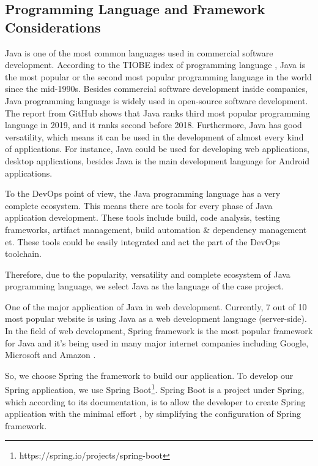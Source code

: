 \subsection{Programming Language and Framework Considerations}
Java is one of the most common languages used in commercial software development. According to the TIOBE index of programming language \cite{indexTIO42:online}, Java is the most popular or the second most popular programming language in the world since the mid-1990s. Besides commercial software development inside companies, Java programming language is widely used in open-source software development. The report \cite{TheState3:online} from GitHub shows that Java ranks third most popular programming language in 2019, and it ranks second before 2018. Furthermore, Java has good versatility, which means it can be used in the development of almost every kind of applications. For instance, Java could be used for developing web applications, desktop applications, besides Java is the main development language for Android applications.
\par
To the DevOps point of view, the Java programming language has a very complete ecosystem. This means there are tools for every phase of Java application development. These tools include build, code analysis, testing frameworks, artifact management, build automation \& dependency management et. These tools could be easily integrated and act the part of the DevOps toolchain.
\par
Therefore, due to the popularity, versatility and complete ecosystem of Java programming language, we select Java as the language of the case project.
\par
One of the major application of Java in web development. Currently, 7 out of 10 \cite{Programm17:online} most popular website is using Java as a web development language (server-side). In the field of web development, Spring framework is the most popular framework for Java and it's being used in many major internet companies including Google, Microsoft and Amazon \cite{SpringWh14:online}. 
\par
So, we choose Spring the framework to build our application. To develop our Spring application, we use Spring Boot\footnote{https://spring.io/projects/spring-boot}. Spring Boot is a project under Spring, which according to its documentation, is to allow the developer to create Spring application with the minimal effort \cite{SpringBo84:online}, by simplifying the configuration of Spring framework. 
